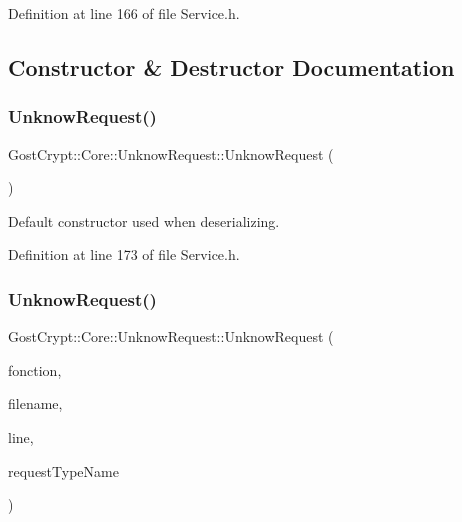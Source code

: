 Definition at line 166 of file Service.\+h.



\subsection{Constructor \& Destructor Documentation}
\mbox{\label{class_gost_crypt_1_1_core_1_1_unknow_request_abe50faa377da57ba0a3afbc92c3a6016}} 
\subsubsection{\texorpdfstring{Unknow\+Request()}{UnknowRequest()}\hspace{0.1cm}{\footnotesize\ttfamily [1/2]}}
{\footnotesize\ttfamily Gost\+Crypt\+::\+Core\+::\+Unknow\+Request\+::\+Unknow\+Request (\begin{DoxyParamCaption}{ }\end{DoxyParamCaption})\hspace{0.3cm}{\ttfamily [inline]}}



Default constructor used when deserializing. 



Definition at line 173 of file Service.\+h.

\mbox{\label{class_gost_crypt_1_1_core_1_1_unknow_request_aab8e3b9ad5a9df302c09c69c8d2765ab}} 
\subsubsection{\texorpdfstring{Unknow\+Request()}{UnknowRequest()}\hspace{0.1cm}{\footnotesize\ttfamily [2/2]}}
{\footnotesize\ttfamily Gost\+Crypt\+::\+Core\+::\+Unknow\+Request\+::\+Unknow\+Request (\begin{DoxyParamCaption}\item[{Q\+String}]{fonction,  }\item[{Q\+String}]{filename,  }\item[{quint32}]{line,  }\item[{const char $\ast$}]{request\+Type\+Name }\end{DoxyParamCaption})\hspace{0.3cm}{\ttfamily [inline]}}



